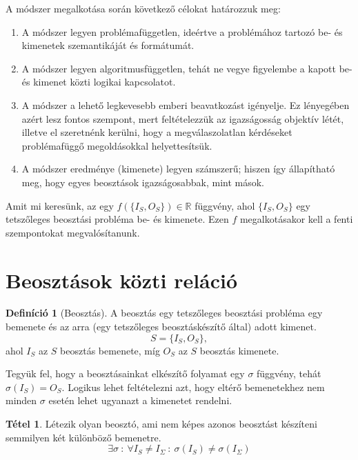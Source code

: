 \documentclass[twocolumn]{article}
\theoremstyle{definition}
\newtheorem{definition}{Definíció}[section]
\newtheorem{theorem}{Tétel}[section]
\newcommand{\set}[1]{ \{ {#1} \} }
\begin{document}
    A módszer megalkotása során következő célokat határozzuk meg:
    \begin{enumerate}
        \item A módszer legyen problémafüggetlen, ideértve a problémához tartozó be- és kimenetek szemantikáját és formátumát.
        \item A módszer legyen algoritmusfüggetlen, tehát ne vegye figyelembe a kapott be- és kimenet közti logikai kapcsolatot.
        \item A módszer a lehető legkevesebb emberi beavatkozást igényelje. Ez lényegében azért lesz fontos szempont, mert feltételezzük az igazságosság objektív létét, illetve el szeretnénk kerülni, hogy a megválaszolatlan kérdéseket problémafüggő megoldásokkal helyettesítsük.
        \item A módszer eredménye (kimenete) legyen számszerű; hiszen így állapítható meg, hogy egyes beosztások igazságosabbak, mint mások.
    \end{enumerate}
    
    Amit mi keresünk, az egy $f( \set{ I_S, O_S }) \in \mathbb{R}$ függvény, ahol $\set{I_S, O_S}$ egy tetszőleges beosztási probléma be- és kimenete. Ezen $f$ megalkotásakor kell a fenti szempontokat megvalósítanunk.

\section{Beosztások közti reláció}
    
    \begin{definition}[Beosztás]
        A beosztás egy tetszőleges beosztási probléma egy bemenete és az arra (egy tetszőleges beosztáskészítő által) adott kimenet.
        \begin{equation} S = \set{I_S, O_S},\end{equation} 
        ahol $I_S$ az $S$ beosztás bemenete, míg $O_S$ az $S$ beosztás kimenete.

    \end{definition}
    
    Tegyük fel, hogy a beosztásainkat elkészítő folyamat egy $\sigma$ függvény, tehát $\sigma(I_S) = O_S$. Logikus lehet feltételezni azt, hogy eltérő bemenetekhez nem minden $\sigma$ esetén lehet ugyanazt a kimenetet rendelni.
    

    \begin{theorem}\label{thm:kulonbozoseg}
    Létezik olyan beosztó, ami nem képes azonos beosztást készíteni semmilyen két különböző bemenetre.
        \begin{equation}
            \exists \sigma \ : \ 
            \forall I_S \neq I_\Sigma \ : \ 
            \sigma(I_S)
            \not= 
            \sigma(I_\Sigma)
        \end{equation}
    \end{theorem}
    
\end{document}
